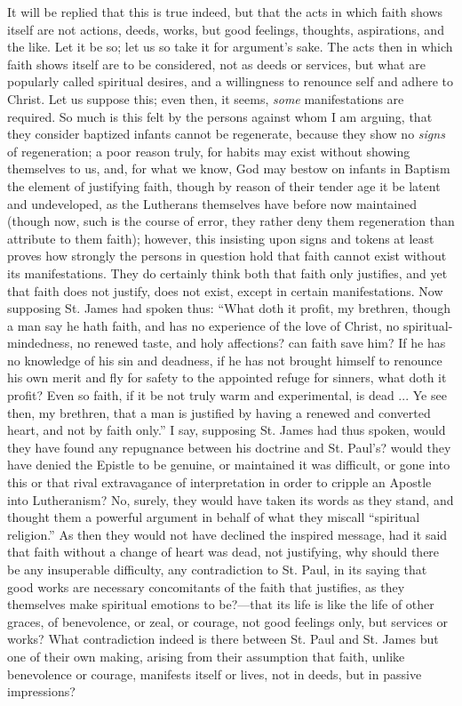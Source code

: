 It will be replied that this is true indeed, but that the acts in
which faith shows itself are not actions, deeds, works, but good
feelings, thoughts, aspirations, and the like. Let it be so; let us so
take it for argument's sake. The acts then in which faith shows itself
are to be considered, not as deeds or services, but what are popularly
called spiritual desires, and a willingness to renounce self and
adhere to Christ. Let us suppose this; even then, it seems, \emph{some}
manifestations are required. So much is this felt by the persons
against whom I am arguing, that they consider baptized infants cannot
be regenerate, because they show no \emph{signs} of regeneration; a
poor reason truly, for habits may exist without showing themselves to
us, and, for what we know, God may bestow on infants in Baptism the
element of justifying faith, though by reason of their tender age it
be latent and undeveloped, as the Lutherans themselves have before now
maintained (though now, such is the course of error, they rather deny
them regeneration than attribute to them faith); however, this
insisting upon signs and tokens at least proves how strongly the
persons in question hold that faith cannot exist without its
manifestations. They do certainly think both that faith only
justifies, and yet that faith does not justify, does not exist, except
in certain manifestations. Now supposing St. James had spoken thus:
``What doth it profit, my brethren, though a man say he hath
faith, and has no experience of the love of Christ, no
spiritual-mindedness, no renewed taste, and holy affections? can faith
save him? If he has no knowledge of his sin and deadness, if he has
not brought himself to renounce his own merit and fly for safety to
the appointed refuge for sinners, what doth it profit? Even so faith,
if it be not truly warm and experimental, is dead ... Ye see
then, my brethren, that a man is justified by having a renewed and
converted heart, and not by faith only.'' I say, supposing St.
James had thus spoken, would they have found any repugnance between
his doctrine and St. Paul's? would they have denied the Epistle to be
genuine, or maintained it was difficult, or gone into this or that
rival extravagance of interpretation in order to cripple an Apostle
into Lutheranism? No, surely, they would have taken its words as they
stand, and thought them a powerful argument in behalf of what they
miscall ``spiritual religion.'' As then they would not have
declined the inspired message, had it said that faith without a change
of heart was dead, not justifying, why should there be any insuperable
difficulty, any contradiction to St. Paul, in its saying that good
works are necessary concomitants of the faith that justifies, as they
themselves make spiritual emotions to be?—that its life is like the
life of other graces, of benevolence, or zeal, or courage, not good
feelings only, but services or works? What contradiction indeed is
there between St. Paul and St. James but one of their own making,
arising from their assumption that faith, unlike benevolence or
courage, manifests itself or lives, not in deeds, but in passive
impressions?

